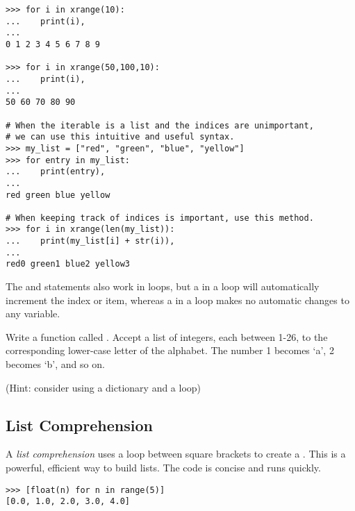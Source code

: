 \begin{lstlisting}
>>> for i in xrange(10):
...    print(i),
...     
0 1 2 3 4 5 6 7 8 9

>>> for i in xrange(50,100,10):
...    print(i),
...
50 60 70 80 90

# When the iterable is a list and the indices are unimportant,
# we can use this intuitive and useful syntax.
>>> my_list = ["red", "green", "blue", "yellow"]
>>> for entry in my_list:
...    print(entry),
...
red green blue yellow

# When keeping track of indices is important, use this method.
>>> for i in xrange(len(my_list)):
...    print(my_list[i] + str(i)),
...
red0 green1 blue2 yellow3
\end{lstlisting}

The  and  statements also work in  loops, but a  in a  loop will automatically increment the index or item, whereas a  in a  loop makes no automatic changes to any variable.


\begin{problem}
Write a function called .
Accept a list  of integers, each between 1-26, to the corresponding lower-case letter of the alphabet.
The number 1 becomes `a', 2 becomes `b', and so on.

(Hint: consider using a dictionary and a loop)
\end{problem}


\subsection*{List Comprehension}
A \emph{list comprehension} uses a loop between square brackets to create a .
This is a powerful, efficient way to build lists.
The code is concise and runs quickly.

\begin{lstlisting}
>>> [float(n) for n in range(5)]
[0.0, 1.0, 2.0, 3.0, 4.0]
\end{lstlisting}

